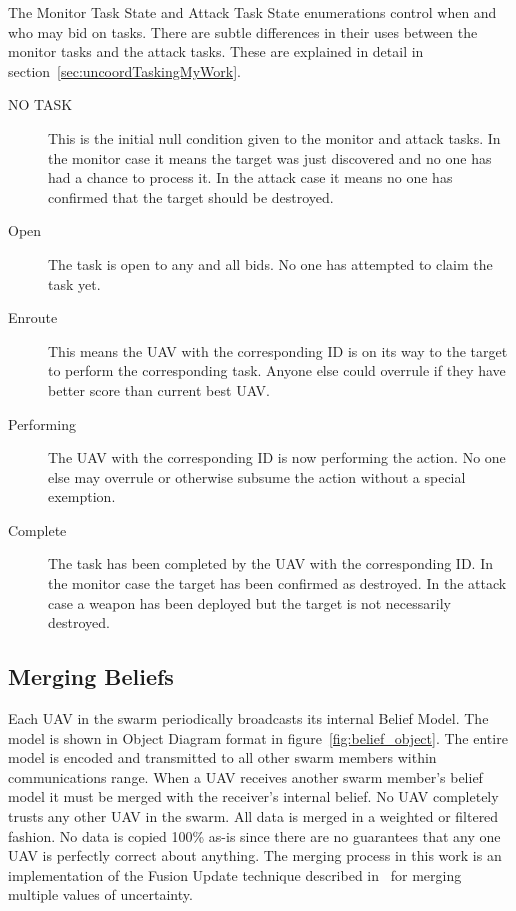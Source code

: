 The Monitor Task State and Attack Task State enumerations control when and who may bid on tasks.  There are subtle differences in their uses between the monitor tasks and the attack tasks.  These are explained in detail in  section~\ref{sec:uncoordTaskingMyWork}.

\begin{description}
	\item [NO TASK] This is the initial null condition given to the monitor and attack tasks.  In the monitor case it means the target was just discovered and no one has had a chance to process it.  In the attack case it means no one has confirmed that the target should be destroyed.
	\item [Open] The task is open to any and all bids.  No one has attempted to claim the task yet.
	\item [Enroute] This means the UAV with the corresponding ID is on its way to the target to perform the corresponding task.  Anyone else could overrule if they have better score than current best UAV.
	\item [Performing] The UAV with the corresponding ID is now performing the action.  No one else may overrule or otherwise subsume the action without a special exemption.%
	\item [Complete] The task has been completed by the UAV with the corresponding ID.  In the monitor case the target has been confirmed as destroyed.  In the attack case a weapon has been deployed but the target is not necessarily destroyed.
\end{description}

\subsection{Merging Beliefs}
\label{sec:mergingBeliefs}
Each UAV in the swarm periodically broadcasts its internal Belief Model.  The model is shown in Object Diagram format in figure~\ref{fig:belief_object}.  The entire model is encoded and transmitted to all other swarm members within communications range.   When a UAV receives another swarm member's belief model it must be merged with the receiver's internal belief.  No UAV completely trusts any other UAV in the swarm.  All data is merged in a weighted or filtered fashion.  No data is copied 100\% as-is since there are no guarantees that any one UAV is perfectly correct about anything.  The merging process in this work is an implementation of the Fusion Update technique described in~\citet{shem} for merging multiple values of uncertainty.
	
